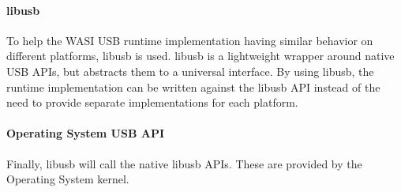 \paragraph{libusb} To help the \acrshort{WASI} \acrshort{USB} runtime implementation having similar behavior on different platforms, libusb \cite{LibUSB} is used. libusb is a lightweight wrapper around native USB APIs, but abstracts them to a universal interface. By using libusb, the runtime implementation can be written against the libusb API instead of the need to provide separate implementations for each platform.

\paragraph{Operating System USB API} Finally, libusb will call the native libusb APIs. These are provided by the Operating System kernel.

% 
% 
% 
% 

